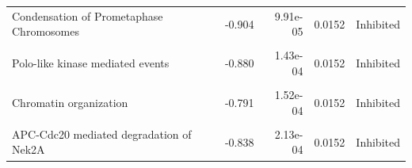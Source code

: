 \documentclass[9pt,a4paper,]{extarticle}
\begin{document}
\begin{table}
{\begin{tabular}[t]{lrrrl}
Condensation of Prometaphase Chromosomes & -0.904 & 9.91e-05 & 0.0152 & Inhibited\\
\cellcolor{gray!6}{Epigenetic regulation of gene expression} & \cellcolor{gray!6}{-0.790} & \cellcolor{gray!6}{1.21e-04} & \cellcolor{gray!6}{0.0152} & \cellcolor{gray!6}{Inhibited}\\
\addlinespace
Polo-like kinase mediated events & -0.880 & 1.43e-04 & 0.0152 & Inhibited\\
\cellcolor{gray!6}{Chromatin modifying enzymes} & \cellcolor{gray!6}{-0.791} & \cellcolor{gray!6}{1.52e-04} & \cellcolor{gray!6}{0.0152} & \cellcolor{gray!6}{Inhibited}\\
Chromatin organization & -0.791 & 1.52e-04 & 0.0152 & Inhibited\\
\cellcolor{gray!6}{SUMO E3 ligases SUMOylate target proteins} & \cellcolor{gray!6}{-0.767} & \cellcolor{gray!6}{1.83e-04} & \cellcolor{gray!6}{0.0152} & \cellcolor{gray!6}{Inhibited}\\
APC-Cdc20 mediated degradation of Nek2A & -0.838 & 2.13e-04 & 0.0152 & Inhibited\\
\bottomrule
\end{tabular}}
\end{table}
\end{document}
